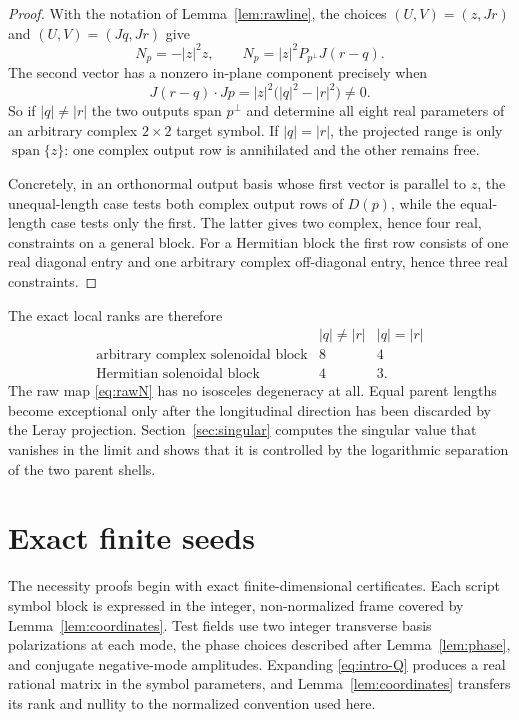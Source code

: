 \documentclass[11pt]{article}
\theoremstyle{definition}
\theoremstyle{remark}
\theoremstyle{plain}
\DeclareMathOperator{\spn}{span}
\begin{document}
\begin{proof}
With the notation of Lemma~\ref{lem:rawline}, the choices $(U,V)=(z,Jr)$ and
$(U,V)=(Jq,Jr)$ give
\begin{equation}
\label{eq:twooutputs}
N_{p}=-|z|^{2}z,
\qquad
N_{p}=|z|^{2}P_{p^{\perp}}J(r-q).
\end{equation}
The second vector has a nonzero in-plane component precisely when
\begin{equation}
\label{eq:inplane}
J(r-q)\cdot Jp=|z|^{2}\bigl(|q|^{2}-|r|^{2}\bigr)\ne0 .
\end{equation}
So if $|q|\ne|r|$ the two outputs span $p^{\perp}$ and determine all eight
real parameters of an arbitrary complex $2\times2$ target symbol. If
$|q|=|r|$, the projected range is only $\spn\{z\}$: one complex output row is
annihilated and the other remains free.

Concretely, in an orthonormal output basis whose first vector is parallel to
$z$, the unequal-length case tests both complex output rows of $D(p)$, while
the equal-length case tests only the first. The latter gives two complex,
hence four real, constraints on a general block. For a Hermitian block the
first row consists of one real diagonal entry and one arbitrary complex
off-diagonal entry, hence three real constraints.
\end{proof}

The exact local ranks are therefore
\begin{equation}
\label{eq:localranks}
\begin{array}{c|c|c}
&|q|\ne|r|&|q|=|r|\\ \hline
\text{arbitrary complex solenoidal block}&8&4\\
\text{Hermitian solenoidal block}&4&3 .
\end{array}
\end{equation}
The raw map \eqref{eq:rawN} has no isosceles degeneracy at all. Equal parent
lengths become exceptional only after the longitudinal direction has been
discarded by the Leray projection. Section~\ref{sec:singular} computes the
singular value that vanishes in the limit and shows that it is controlled by
the logarithmic separation of the two parent shells.

\section{Exact finite seeds}
\label{sec:seeds}

The necessity proofs begin with exact finite-dimensional certificates. Each
script symbol block is expressed in the integer, non-normalized frame covered
by Lemma~\ref{lem:coordinates}. Test fields use two integer transverse basis
polarizations at each mode, the phase choices described after
Lemma~\ref{lem:phase}, and conjugate negative-mode amplitudes. Expanding
\eqref{eq:intro-Q} produces a real rational matrix in the symbol parameters,
and Lemma~\ref{lem:coordinates} transfers its rank and nullity to the
normalized convention used here.
\end{document}
